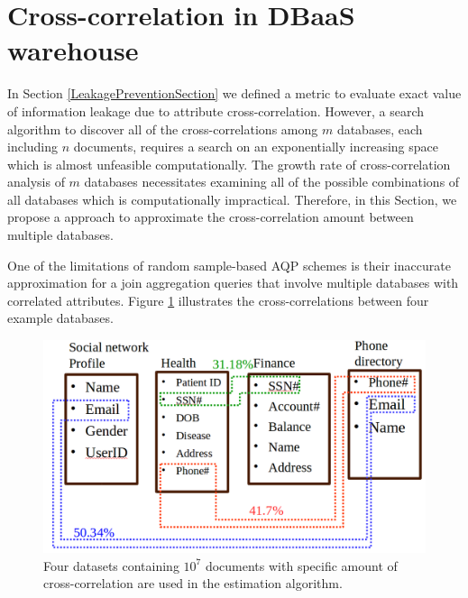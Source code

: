 \section{Cross-correlation in DBaaS warehouse}
\label{DBaaSCrossCorrelationSection}
In Section \ref{LeakagePreventionSection} we defined a metric to evaluate exact value of information leakage due to attribute cross-correlation. However, a search algorithm to discover all of the cross-correlations among $m$ databases, each including $n$ documents, requires a search on an exponentially increasing space which is almost unfeasible computationally. The growth rate of cross-correlation analysis of $m$ databases necessitates examining all of the possible combinations of all databases which is computationally impractical. Therefore, in this Section, we propose a approach to approximate the cross-correlation amount between multiple databases. 

One of the limitations of random sample-based AQP schemes is their inaccurate approximation for a join aggregation queries that involve multiple databases with correlated attributes. Figure \ref{fig:cross-correlationMap} illustrates the cross-correlations between four example databases. 

\begin{figure}[H]
\centering
\includegraphics[width=0.7\linewidth]{figures/cross-correlationMap}
\caption[Cross-correlation map]{Four datasets containing $10^7$ documents with specific amount of cross-correlation are used in the estimation algorithm.}
\label{fig:cross-correlationMap}
\end{figure}

